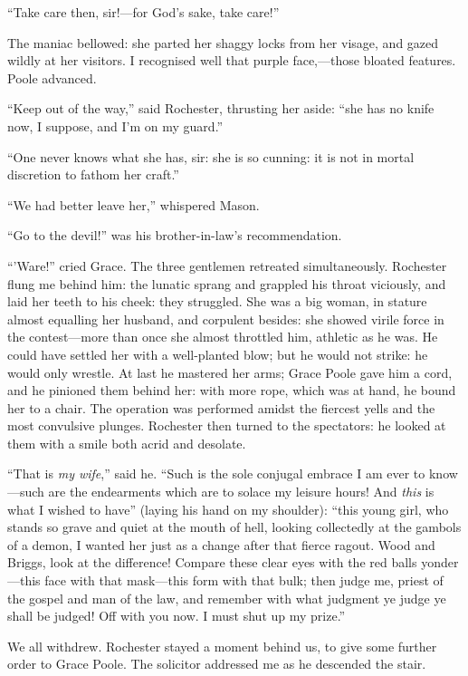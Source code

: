 \enquote{Take care then, sir!---for God's sake, take care!}

The maniac bellowed: she parted her shaggy locks from her visage, and
gazed wildly at her visitors. I recognised well that purple
face,---those bloated features. \Mrs{} Poole advanced.

\enquote{Keep out of the way,} said \Mr{} Rochester, thrusting her aside:
\enquote{she has no knife now, I suppose, and I'm on my guard.}

\enquote{One never knows what she has, sir: she is so cunning: it is not
in mortal discretion to fathom her craft.}

\enquote{We had better leave her,} whispered Mason.

\enquote{Go to the devil!} was his brother-in-law's recommendation.

\enquote{'Ware!} cried Grace. The three gentlemen retreated
simultaneously. \Mr{} Rochester flung me behind him: the lunatic sprang
and grappled his throat viciously, and laid her teeth to his cheek: they
struggled. She was a big woman, in stature almost equalling her
husband, and corpulent besides: she showed virile force in the
contest---more than once she almost throttled him, athletic as he was. 
He could have settled her with a well-planted blow; but he would not
strike: he would only wrestle. At last he mastered her arms; Grace
Poole gave him a cord, and he pinioned them behind her: with more rope,
which was at hand, he bound her to a chair. The operation was performed
amidst the fiercest yells and the most convulsive plunges. \Mr{}
 Rochester then turned to the spectators: he looked at them with a smile
both acrid and desolate.

\enquote{That is \emph{my wife},} said he. \enquote{Such is the sole conjugal
embrace I am ever to know---such are the endearments which are to solace
my leisure hours! And \emph{this} is what I wished to have} (laying
his hand on my shoulder): \enquote{this young girl, who stands so grave
and quiet at the mouth of hell, looking collectedly at the gambols of a
demon, I wanted her just as a change after that fierce ragout. Wood and
Briggs, look at the difference! Compare these clear eyes with the red
balls yonder---this face with that mask---this form with that bulk; then
judge me, priest of the gospel and man of the law, and remember with
what judgment ye judge ye shall be judged! Off with you now. I must
shut up my prize.}

We all withdrew. \Mr{} Rochester stayed a moment behind us, to give some
further order to Grace Poole. The solicitor addressed me as he
descended the stair.

